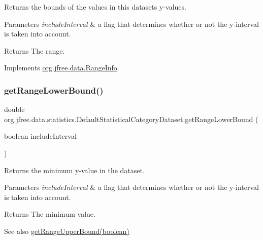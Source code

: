 Returns the bounds of the values in this dataset\textquotesingle{}s y-\/values.


\begin{DoxyParams}{Parameters}
{\em include\+Interval} & a flag that determines whether or not the y-\/interval is taken into account.\\
\hline
\end{DoxyParams}
\begin{DoxyReturn}{Returns}
The range. 
\end{DoxyReturn}


Implements \mbox{\hyperlink{interfaceorg_1_1jfree_1_1data_1_1_range_info_a2752094d868839b5565131a5bdd8e75e}{org.\+jfree.\+data.\+Range\+Info}}.

\mbox{\label{classorg_1_1jfree_1_1data_1_1statistics_1_1_default_statistical_category_dataset_ae20e8ce5b0dfff4b36629d20584e0f20}} 
\subsubsection{\texorpdfstring{get\+Range\+Lower\+Bound()}{getRangeLowerBound()}}
{\footnotesize\ttfamily double org.\+jfree.\+data.\+statistics.\+Default\+Statistical\+Category\+Dataset.\+get\+Range\+Lower\+Bound (\begin{DoxyParamCaption}\item[{boolean}]{include\+Interval }\end{DoxyParamCaption})}

Returns the minimum y-\/value in the dataset.


\begin{DoxyParams}{Parameters}
{\em include\+Interval} & a flag that determines whether or not the y-\/interval is taken into account.\\
\hline
\end{DoxyParams}
\begin{DoxyReturn}{Returns}
The minimum value.
\end{DoxyReturn}
\begin{DoxySeeAlso}{See also}
\mbox{\hyperlink{classorg_1_1jfree_1_1data_1_1statistics_1_1_default_statistical_category_dataset_a11d0eee861d88a758d3a400d428aebc8}{get\+Range\+Upper\+Bound(boolean)}} 
\end{DoxySeeAlso}


